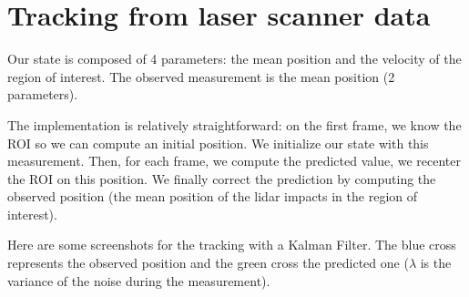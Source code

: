 \documentclass[a4paper,11pt]{article}
\begin{document}
\newpage
\section{Tracking from laser scanner data}
Our state is composed of 4 parameters: the mean position and the velocity of
the region of interest. The observed measurement is the mean position (2
parameters).

The implementation is relatively straightforward: on the first frame, we know
the ROI so we can compute an initial position. We initialize our state with this
measurement. Then, for each frame, we compute the predicted value, we recenter
the ROI on this position. We finally correct the prediction by computing the
observed position (the mean position of the lidar impacts in the region of
interest).

Here are some screenshots for the tracking with a Kalman Filter. The blue cross
represents the observed position and the green cross the predicted one ($
\lambda $ is the variance of the noise during the measurement).
\end{document}
